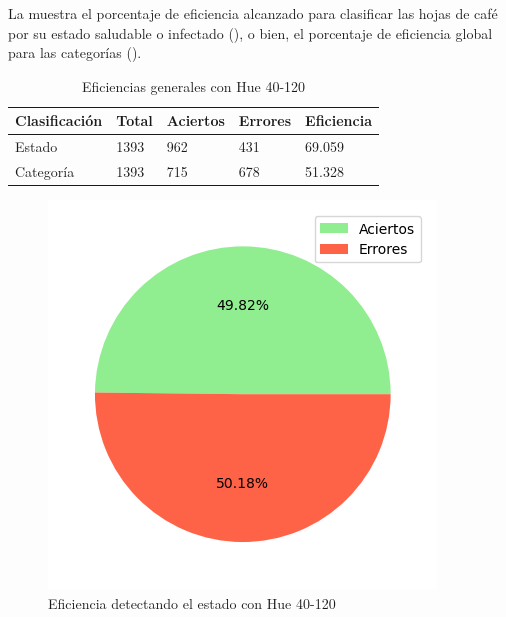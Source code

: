 La  muestra el porcentaje de eficiencia alcanzado para clasificar las hojas de café por su estado saludable o infectado (), o bien, el porcentaje de eficiencia global para las categorías ().

\begin{table}[h!]
\centering
\begin{tabular}{|l|l|l|l|l|}
\hline 
\textbf{Clasificación} & \textbf{Total} & \textbf{Aciertos} & \textbf{Errores} & \textbf{Eficiencia} \\
\hline
Estado & 1393 & 962 & 431 & 69.059 \\
\hline 
Categoría & 1393 & 715 & 678 & 51.328 \\
\hline 
\end{tabular}
\caption{Eficiencias generales con Hue 40-120}
\label{table:efficiency_general_40_120}
\end{table}

\captionsetup[figure]{skip=-10pt}

\begin{figure}[!ht]
\centering
\includegraphics[scale=0.6]{images/result_global_state_40_120.png}
\caption{Eficiencia detectando el estado con Hue 40-120}
\label{img:efficiency_state_40_120}
\end{figure}

